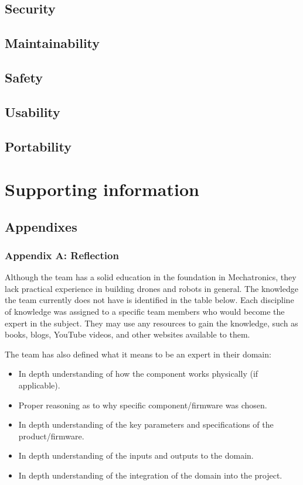 \documentclass{article}
\begin{document}
\subsection{Security}
\subsection{Maintainability}
\subsection{Safety}
\subsection{Usability}
\subsection{ Portability}

\section{Supporting information}
\subsection{Appendixes}
\subsubsection{Appendix A: Reflection}
Although the team has a solid education in the foundation in Mechatronics, they lack practical experience in building drones and robots in general. The knowledge the team currently does not have is identified in the table below. Each discipline of knowledge was assigned to a specific team members who would become the expert in the subject. They may use any resources to gain the knowledge, such as books, blogs, YouTube videos, and other websites available to them. 

The team has also defined what it means to be an expert in their domain: 
\begin{itemize}
    \item In depth understanding of how the component works physically (if applicable). 
    \item Proper reasoning as to why specific component/firmware was chosen.
    \item In depth understanding of the key parameters and specifications of the product/firmware.
    \item In depth understanding of the inputs and outputs to the domain. 
    \item In depth understanding of the integration of the domain into the project. 
\end{itemize}
\end{document}
